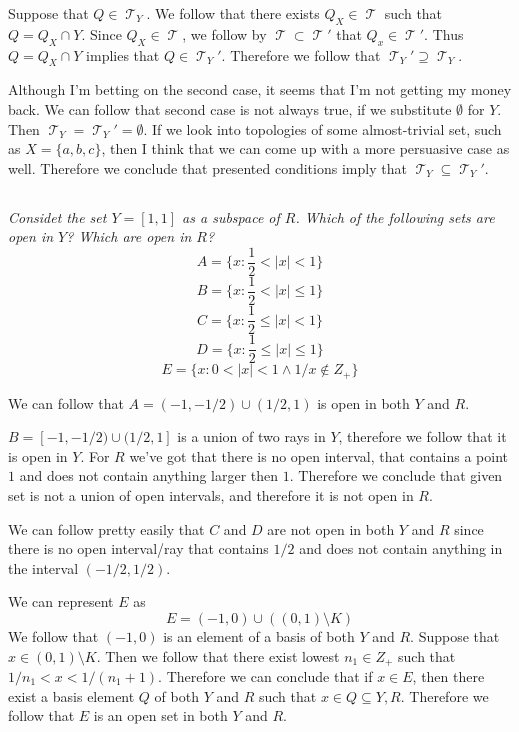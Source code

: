 \documentclass[11pt,oneside,titlepage]{book}
\DeclareMathOperator \topol {\mathcal {T}}
\newcommand{\set}[1]{\{ #1 \}}
\begin{document}
Suppose that $Q \in \topol_Y$. We follow that there exists $Q_X \in \topol$ such that
$Q = Q_X \cap Y$. Since $Q_X \in \topol$, we follow by $\topol \subset \topol'$ that
$Q_x \in \topol'$. Thus $Q = Q_X \cap Y$ implies that $Q \in \topol_Y'$. Therefore we follow that
$\topol_Y' \supseteq \topol_Y$.

Although I'm betting on the second case, it seems that I'm not getting my money back.
We can follow that second case is not always true, if we substitute $\emptyset$ for $Y$.
Then $\topol_Y = \topol_Y' = \emptyset$. If we look into topologies of some
almost-trivial set, such as $X = \set{a, b, c}$, then I think that we can come up with a more
persuasive case as well. Therefore we conclude that
presented conditions imply that $\topol_Y \subseteq \topol_Y'$.

\subsection{}

\textit{Considet the set $Y = [1, 1]$ as a subspace of $R$. Which of the following sets are
  open in $Y$? Which are open in $R$?
  $$A = \set{x : \frac{1}{2} < |x| < 1 }$$
  $$B = \set{x : \frac{1}{2} < |x| \leq 1 }$$
  $$C = \set{x : \frac{1}{2} \leq |x| < 1 }$$
  $$D = \set{x : \frac{1}{2} \leq |x| \leq 1 }$$
  $$E = \set{x : 0 < |x| < 1 \land 1/x \notin Z_+ }$$
}

We can follow that
$A = (-1, -1/2) \cup (1/2, 1)$
is open in both $Y$ and $R$.

$B = [-1, -1/2) \cup (1/2, 1]$
is a union of two rays in $Y$, therefore we follow that it is open in $Y$. For $R$ we've got that
there is no open interval, that contains a point $1$ and does not contain anything larger
then $1$. Therefore we conclude that given set is not a union of open intervals, and therefore
it is not open in $R$.

We can follow pretty easily that $C$ and $D$ are not open in both $Y$ and $R$ since there is
no open interval/ray that contains $1/2$ and does not contain anything in the interval
$(-1/2, 1/2)$.

We can represent $E$ as
$$E = (-1, 0) \cup ((0, 1) \setminus K)$$
We follow that $(-1, 0)$ is an element of a basis of both $Y$ and $R$. Suppose
that $x \in (0, 1) \setminus K$. Then we follow that there exist lowest $n_1 \in Z_+$ such that
$1/n_1 < x < 1/(n_1 + 1)$. Therefore we can conclude that if $x \in E$, then there exist
a basis element $Q$ of both $Y$ and $R$ such that $x \in Q \subseteq Y, R$. Therefore
we follow that $E$ is an open set in both $Y$ and $R$.
\end{document}

